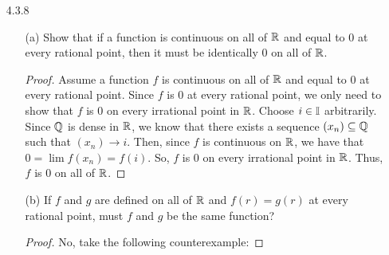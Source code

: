 \documentclass[12pt,letterpaper]{article}
\begin{document}
\begin{itemize}[leftmargin=!,labelindent=5pt]
\begin{itemize}
\begin{proof}
                        Choose $\epsilon > 0$ arbitrarily.
                        Let $T = \{x \in \bbR : t(x) \geq \epsilon\}$.
                        Then, for all $x\in T$, $x \in \bbQ$ so $\exists m,n \in \bbZ$ such that $x = \frac{m}{n}$ and $0 < n \leq \frac{1}{\epsilon}$.
                        Then, if we look at some fixed interval around $i$ like $[i-1, i+1]$, we can see that $T \cap [i-1, i+1]$ is finite since there are only a finite amount of rational numbers within this interval with a denominator less than $\frac{1}{\epsilon}$.
                        Since $T \cap [i-1, i+1]$ is finite, we can choose $\delta > 0$ such that for all $v \in V_\delta(i)$, $v \notin T$ which means that $t(v) \in V_\epsilon(t(i))$.
                        Thus, $t$ is continuous at every irrational point by Theorem 4.3.2 (iii).
                    \end{proof}
            \end{itemize}
        \newpage
        \item [4.3.8]
            \begin{itemize}
                \item [(a)] Show that if a function is continuous on all of $\mathbb{R}$ and equal to 0 at every rational point, then it must be identically 0 on all of $\mathbb{R}$.
                    \begin{proof}
                        Assume a function $f$ is continuous on all of $\mathbb{R}$ and equal to 0 at every rational point.
                        Since $f$ is 0 at every rational point, we only need to show that $f$ is 0 on every irrational point in $\mathbb{R}$.
                        Choose $i\in\mathbb{I}$ arbitrarily.
                        Since $\mathbb{Q}$ is dense in $\mathbb{R}$, we know that there exists a sequence $(x_n) \subseteq \mathbb{Q}$ such that $(x_n)\to i$.
                        Then, since $f$ is continuous on $\mathbb{R}$, we have that $0 = \lim f(x_n) = f(i)$.
                        So, $f$ is 0 on every irrational point in $\mathbb{R}$.
                        Thus, $f$ is 0 on all of $\mathbb{R}$.
                    \end{proof}
                \item [(b)] If $f$ and $g$ are defined on all of $\mathbb{R}$ and $f(r) = g(r)$ at every rational point, must $f$ and $g$ be the same function?
                    \begin{proof}
                        No, take the following counterexample:


\end{proof}
\end{itemize}
\end{itemize}
\end{document}
